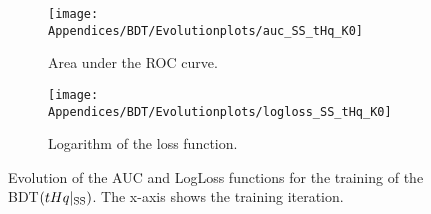 \begin{figure}[h]
\centering
\begin{subfigure}{.475\textwidth}
  \centering
  \texttt{[image: Appendices/BDT/Evolutionplots/auc\_SS\_tHq\_K0]}
  \caption{Area under the ROC curve.}
  \label{fig:ChaptH:EventSelection:BDT:Epochs:tHqSS:AUC}
\end{subfigure}%
\begin{subfigure}{.475\textwidth}
  \centering
  \texttt{[image: Appendices/BDT/Evolutionplots/logloss\_SS\_tHq\_K0]}
  \caption{Logarithm of the loss function.}
  \label{fig:ChaptH:EventSelection:BDT:Epochs:tHqSS:LogLoss}
\end{subfigure}
\caption{Evolution of the AUC and LogLoss functions for the training of the BDT$(tHq|_{\text{SS}})$.
The x-axis shows the training iteration.}
\label{fig:ChaptH:EventSelection:BDT:Epochs:tHqSS}
\end{figure}


